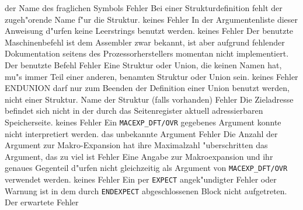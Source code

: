 \documentclass[12pt,a4paper,twoside]{report}
\newcommand{\tty}[1]{{\tt #1}}
\begin{document}
\begin{description}
               {der Name des fraglichen Symbols}
               {Fehler}
               {Bei einer Strukturdefinition fehlt der zugeh"orende
                Name f"ur die Struktur.}
               {keines}
               {Fehler}
               {In der Argumentenliste dieser Anweisung d"urfen keine
                Leerstrings benutzt werden.}
               {keines}
               {Fehler}
               {Der benutzte Maschinenbefehl ist dem Assembler
                zwar bekannt, ist aber aufgrund fehlender
                Dokumentation seitens des Prozessorherstellers
                momentan nicht implementiert.}
               {Der benutzte Befehl}
               {Fehler}
               {Eine Struktur oder Union, die keinen Namen hat, mu"s
                immer Teil einer anderen, benamten Struktur oder Union
                sein.}
               {keines}
               {Fehler}
               {ENDUNION darf nur zum Beenden der Definition einer
                Union benutzt werden, nicht einer Struktur.}
               {Name der Struktur (falls vorhanden)}
               {Fehler}
               {Die Zieladresse befindet sich nicht in der durch
                das Seitenregister aktuell adressierbaren
                Speicherseite.}
               {keines}
               {Fehler}
               {Ein \tty{MACEXP\_DFT/OVR} gegebenes Argument konnte nicht
                interpretiert werden.}
               {das unbekannte Argument}
               {Fehler}
               {Die Anzahl der Argument zur Makro-Expansion hat ihre Maximalzahl "uberschritten}
               {das Argument, das zu viel ist}
               {Fehler}
               {Eine Angabe zur Makroexpansion und ihr genaues
                Gegenteil d"urfen nicht gleichzeitig als Argument
                von \tty{MACEXP\_DFT/OVR} verwendet werden.}
               {keines}
               {Fehler}
               {Ein per {\tt EXPECT} angek"undigter Fehler oder Warnung ist
                in dem durch {\tt ENDEXPECT} abgeschlossenen Block nicht aufgetreten.}
               {Der erwartete Fehler}

\end{description}
\end{document}
